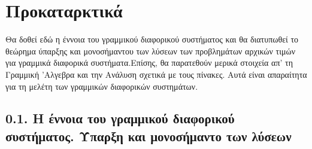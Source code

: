 \documentclass[11pt,a4paper,twoside]{book}
\begin{document}
\section*{Προκαταρκτικά}

Θα δοθεί εδώ η έννοια του γραμμικού διαφορικού συστήματος και θα διατυπωθεί το θεώρημα ύπαρξης και μονοσήμαντου των λύσεων των προβλημάτων αρχικών τιμών για γραμμικά διαφορικά συστήματα.Επίσης, θα παρατεθούν μερικά στοιχεία απ' τη Γραμμική 'Αλγεβρα και την Ανάλυση σχετικά με τους πίνακες. Αυτά είναι απαραίτητα για τη μελέτη των γραμμικών διαφορικών συστημάτων.
\subsection*{0.1. Η έννοια του γραμμικού διαφορικού συστήματος. Ύπαρξη και μονοσήμαντο των λύσεων}
\end{document}
